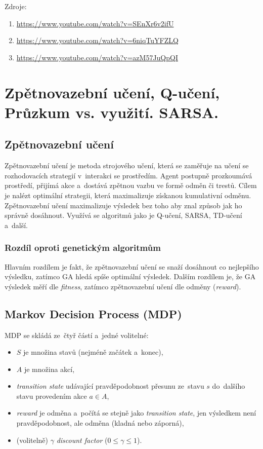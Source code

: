 Zdroje:
\begin{enumerate}
    \item \url{https://www.youtube.com/watch?v=SEnXr6v2ifU}
    \item \url{https://www.youtube.com/watch?v=6niqTuYFZLQ}
    \item \url{https://www.youtube.com/watch?v=azM57JuQpQI}
\end{enumerate}



\clearpage
\section{Zpětnovazební učení, Q-učení, Průzkum vs. využití. SARSA.}

\subsection{Zpětnovazební učení}

Zpětnovazební učení je metoda strojového učení, která se zaměřuje na učení se rozhodovacích strategií v~interakci se prostředím. Agent postupně prozkoumává prostředí, přijímá akce a~dostává zpětnou vazbu ve formě odměn či trestů. Cílem je nalézt optimální strategii, která maximalizuje získanou kumulativní odměnu. Zpětnovazební učení maximalizuje výsledek bez toho aby znal způsob jak ho správně dosáhnout.
Využívá se algoritmů jako je Q-učení, SARSA, TD-učení a~další.

\subsubsection{Rozdíl oproti genetickým algoritmům}

Hlavním rozdílem je fakt, že zpětnovazební učení se snaží dosáhnout co nejlepšího výsledku, zatímco GA hledá spíše optimální výsledek.
Dalším rozdílem je, že GA výsledek měří dle \emph{fitness}, zatímco zpětnovazební učení dle odměny (\emph{reward}).

\subsection{Markov Decision Process (MDP)}

MDP se skládá ze~čtyř částí a~jedné volitelné:
\begin{itemize}
    \item $S$ je množina stavů (nejméně začátek a~konec),
    \item $A$ je množina akcí,
    \item \emph{transition state} udávající pravděpodobnost přesunu ze~stavu $s$ do~dalšího stavu provedením akce $a \in A$,
    \item \emph{reward} je odměna a~počítá se stejně jako \emph{transition state}, jen výsledkem není pravděpodobnost, ale odměna (kladná nebo záporná),
    \item (volitelně) $\gamma$ \emph{discount factor} ($0 \leq \gamma \leq 1$).
\end{itemize}

